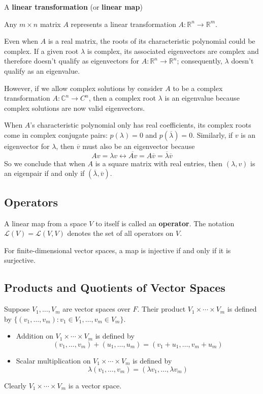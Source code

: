 \documentclass[12pt]{article}
\newcommand{\R}{\mathbb{R}}
\renewcommand{\C}{\mathbb{C}}
\begin{document}
A \textbf{linear transformation} (or \textbf{linear map})

Any $m \times n$ matrix $A$ represents a linear transformation $A : \R^n \to \R^m$.

Even when $A$ is a real matrix, the roots of its characteristic polynomial could be complex. If a given root $\lambda$ is complex, its associated eigenvectors are complex and therefore doesn't qualify as eigenvectors for $A : \R^n \to \R^n$; consequently, $\lambda$ doesn't qualify as an eigenvalue.

However, if we allow complex solutions by consider $A$ to be a complex transformation $A : \C^n \to C^n$, then a complex root $\lambda$ is an eigenvalue because complex solutions are now valid eigenvectors.

When $A$'s characteristic polynomial only has real coefficients, its complex roots come in complex conjugate pairs: $p(\lambda) = 0$ and $p(\overline{\lambda}) = 0$. Similarly, if $v$ is an eigenvector for $\lambda$, then $\overline{v}$ must also be an eigenvector because $$Av = \lambda v \leftrightarrow \overline{Av} = A\overline{v} = \overline{\lambda} \overline{v}$$ So we conclude that when $A$ is a square matrix with real entries, then $(\lambda, v)$ is an eigenpair if and only if $(\overline{\lambda}, \overline{v})$.

\subsection{Operators}

A linear map from a space $V$ to itself is called an \textbf{operator}. The notation $\mathcal{L}(V) = \mathcal{L}(V, V)$ denotes the set of all operators on $V$.

For finite-dimensional vector spaces, a map is injective if and only if it is surjective.

\subsection{Products and Quotients of Vector Spaces}

Suppose $V_1, \ldots, V_m$ are vector spaces over $F$. Their product $V_1 \times \cdots \times V_m$ is defined by $\{ (v_1, \ldots, v_m) : v_1 \in V_1, \ldots, v_m \in V_m \}$. \begin{itemize}
	\item Addition on $V_1 \times \cdots \times V_m$ is defined by $$(v_1, \ldots, v_m) + (u_1, \ldots, u_m) = (v_1 + u_1, \ldots, v_m + u_m)$$
	\item Scalar multiplication on $V_1 \times \cdots \times V_m$ is defined by $$\lambda(v_1, \ldots, v_m) = (\lambda v_1, \ldots, \lambda v_m)$$
\end{itemize} Clearly $V_1 \times \cdots \times V_m$ is a vector space.
\end{document}
